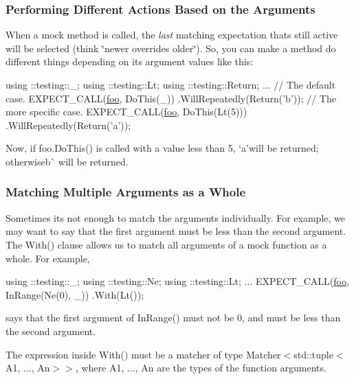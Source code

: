 \subsubsection*{Performing Different Actions Based on the Arguments}

When a mock method is called, the {\itshape last} matching expectation that\textquotesingle{}s still active will be selected (think \char`\"{}newer overrides older\char`\"{}). So, you can make a method do different things depending on its argument values like this\+:


\begin{DoxyCode}
using ::testing::\_;
using ::testing::Lt;
using ::testing::Return;
...
  \textcolor{comment}{// The default case.}
  EXPECT\_CALL(\mbox{\hyperlink{namespacefoo}{foo}}, DoThis(\_))
      .WillRepeatedly(Return(\textcolor{charliteral}{'b'}));
  \textcolor{comment}{// The more specific case.}
  EXPECT\_CALL(\mbox{\hyperlink{namespacefoo}{foo}}, DoThis(Lt(5)))
      .WillRepeatedly(Return(\textcolor{charliteral}{'a'}));
\end{DoxyCode}


Now, if {\ttfamily foo.\+Do\+This()} is called with a value less than 5, `\textquotesingle{}a'{\ttfamily will be returned; otherwise}\textquotesingle{}b\textquotesingle{}\`{} will be returned.

\subsubsection*{Matching Multiple Arguments as a Whole}

Sometimes it\textquotesingle{}s not enough to match the arguments individually. For example, we may want to say that the first argument must be less than the second argument. The {\ttfamily With()} clause allows us to match all arguments of a mock function as a whole. For example,


\begin{DoxyCode}
using ::testing::\_;
using ::testing::Ne;
using ::testing::Lt;
...
  EXPECT\_CALL(\mbox{\hyperlink{namespacefoo}{foo}}, InRange(Ne(0), \_))
      .With(Lt());
\end{DoxyCode}


says that the first argument of {\ttfamily In\+Range()} must not be 0, and must be less than the second argument.

The expression inside {\ttfamily With()} must be a matcher of type {\ttfamily Matcher$<$std\+::tuple$<$A1, ..., An$>$$>$}, where {\ttfamily A1}, ..., {\ttfamily An} are the types of the function arguments.

